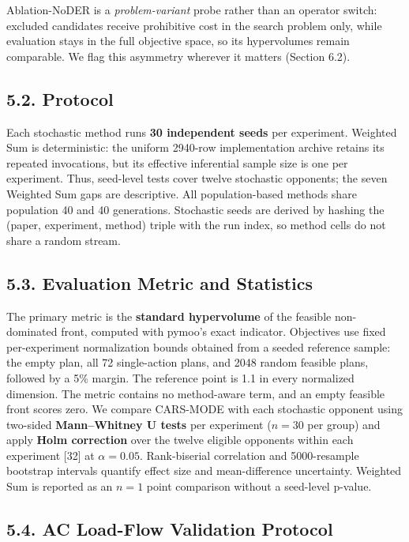 \documentclass[
  10pt,
  a4paper,
]{article}
\begin{document}
Ablation-NoDER is a \emph{problem-variant} probe rather than an operator
switch: excluded candidates receive prohibitive cost in the search
problem only, while evaluation stays in the full objective space, so its
hypervolumes remain comparable. We flag this asymmetry wherever it
matters (Section 6.2).

\subsection{5.2. Protocol}\label{protocol}

Each stochastic method runs \textbf{30 independent seeds} per
experiment. Weighted Sum is deterministic: the uniform 2940-row
implementation archive retains its repeated invocations, but its
effective inferential sample size is one per experiment. Thus,
seed-level tests cover twelve stochastic opponents; the seven Weighted
Sum gaps are descriptive. All population-based methods share population
40 and 40 generations. Stochastic seeds are derived by hashing the
(paper, experiment, method) triple with the run index, so method cells
do not share a random stream.

\subsection{5.3. Evaluation Metric and
Statistics}\label{evaluation-metric-and-statistics}

The primary metric is the \textbf{standard hypervolume} of the feasible
non-dominated front, computed with pymoo's exact indicator. Objectives
use fixed per-experiment normalization bounds obtained from a seeded
reference sample: the empty plan, all 72 single-action plans, and 2048
random feasible plans, followed by a 5\% margin. The reference point is
1.1 in every normalized dimension. The metric contains no method-aware
term, and an empty feasible front scores zero. We compare CARS-MODE with
each stochastic opponent using two-sided \textbf{Mann--Whitney U tests}
per experiment (\(n = 30\) per group) and apply \textbf{Holm correction}
over the twelve eligible opponents within each experiment {[}32{]} at
\(\alpha = 0.05\). Rank-biserial correlation and 5000-resample bootstrap
intervals quantify effect size and mean-difference uncertainty. Weighted
Sum is reported as an \(n=1\) point comparison without a seed-level
p-value.

\subsection{5.4. AC Load-Flow Validation
Protocol}\label{ac-load-flow-validation-protocol}
\end{document}
